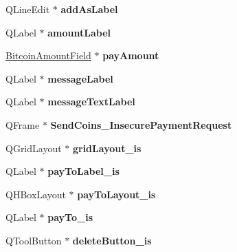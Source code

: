 \begin{DoxyCompactItemize}
Q\+Line\+Edit $\ast$ {\bfseries add\+As\+Label}
\item 
\mbox{\label{class_ui___send_coins_entry_ac2febe6f70fdea0933aeead3e2226725}} 
Q\+Label $\ast$ {\bfseries amount\+Label}
\item 
\mbox{\label{class_ui___send_coins_entry_ae358a9b58e679b4ceda4a0c3f374b095}} 
\mbox{\hyperlink{class_bitcoin_amount_field}{Bitcoin\+Amount\+Field}} $\ast$ {\bfseries pay\+Amount}
\item 
\mbox{\label{class_ui___send_coins_entry_af27473ee1e997b5074668c6b15970c60}} 
Q\+Label $\ast$ {\bfseries message\+Label}
\item 
\mbox{\label{class_ui___send_coins_entry_a5c8c7b63b6ca0b5ec5fe7bce0828bd34}} 
Q\+Label $\ast$ {\bfseries message\+Text\+Label}
\item 
\mbox{\label{class_ui___send_coins_entry_a6f81000c4c887455cbe49868633d2610}} 
Q\+Frame $\ast$ {\bfseries Send\+Coins\+\_\+\+Insecure\+Payment\+Request}
\item 
\mbox{\label{class_ui___send_coins_entry_ab04ca4ab8dcfea0807a52cab9bdb943f}} 
Q\+Grid\+Layout $\ast$ {\bfseries grid\+Layout\+\_\+is}
\item 
\mbox{\label{class_ui___send_coins_entry_a7497fca0058eeae85527d66ca961b123}} 
Q\+Label $\ast$ {\bfseries pay\+To\+Label\+\_\+is}
\item 
\mbox{\label{class_ui___send_coins_entry_ac99944d1e7e8bb02fe4d41ff317de35c}} 
Q\+H\+Box\+Layout $\ast$ {\bfseries pay\+To\+Layout\+\_\+is}
\item 
\mbox{\label{class_ui___send_coins_entry_a8bdedbf4801d72236b7b3a6a444a06bc}} 
Q\+Label $\ast$ {\bfseries pay\+To\+\_\+is}
\item 
\mbox{\label{class_ui___send_coins_entry_a0b70c50cb4a5db91f18c9dea921429cc}} 
Q\+Tool\+Button $\ast$ {\bfseries delete\+Button\+\_\+is}

\end{DoxyCompactItemize}
